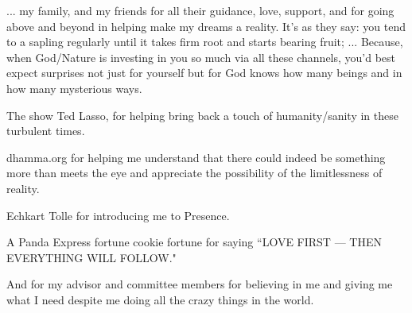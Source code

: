 ... my family, and my friends for all their guidance, love, support, and for going above and beyond in helping make my dreams a reality. It's as they say: you tend to a sapling regularly until it takes firm root and starts bearing fruit; ... Because, when God/Nature is investing in you so much via all these channels, you'd best expect surprises not just for yourself but for God knows how many beings and in how many mysterious ways.

The show Ted Lasso, for helping bring back a touch of humanity/sanity in these turbulent times.

dhamma.org for helping me understand that there could indeed be something more than meets the eye and appreciate the possibility of the limitlessness of reality.

Echkart Tolle for introducing me to Presence.

A Panda Express fortune cookie fortune for saying ``LOVE FIRST --- THEN EVERYTHING WILL FOLLOW."

And for my advisor and committee members for believing in me and giving me what I need despite me doing all the crazy things in the world.